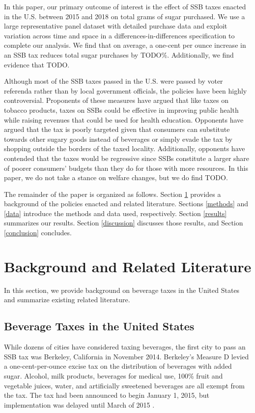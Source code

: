 \documentclass[12pt]{article}
\begin{document}
In this paper, our primary outcome of interest is the effect of SSB taxes enacted in the U.S. between 2015 and 2018 on total grams of sugar purchased. We use a large representative panel dataset with detailed purchase data and exploit variation across time and space in a differences-in-differences specification to complete our analysis. We find that on average, a one-cent per ounce increase in an SSB tax reduces total sugar purchases by TODO\%. Additionally, we find evidence that TODO.

Although most of the SSB taxes passed in the U.S. were passed by voter referenda rather than by local government officials, the policies have been highly controversial. Proponents of these measures have argued that like taxes on tobacco products, taxes on SSBs could be effective in improving public health while raising revenues that could be used for health education. Opponents have argued that the tax is poorly targeted given that consumers can substitute towards other sugary goods instead of beverages or simply evade the tax by shopping outside the borders of the taxed locality. Additionally, opponents have contended that the taxes would be regressive since SSBs constitute a larger share of poorer consumers' budgets than they do for those with more resources. In this paper, we do not take a stance on welfare changes, but we do find TODO.

The remainder of the paper is organized as follows. Section \ref{background} provides a background of the policies enacted and related literature. Sections \ref{methods} and \ref{data} introduce the methods and data used, respectively. Section \ref{results} summarizes our results. Section \ref{discussion} discusses those results, and Section \ref{conclusion} concludes.

\section{Background and Related Literature} \label{background}

In this section, we provide background on beverage taxes in the United States and summarize existing related literature.

\subsection{Beverage Taxes in the United States}

While dozens of cities have considered taxing beverages, the first city to pass an SSB tax was Berkeley, California in November 2014. Berkeley's Measure D levied a one-cent-per-ounce excise tax on the distribution of beverages with added sugar. Alcohol, milk products, beverages for medical use, 100\% fruit and vegetable juices, water, and artificially sweetened beverages are all exempt from the tax. The tax had been announced to begin January 1, 2015, but implementation was delayed until March of 2015 \parencite{falbe2015higher}.
\end{document}
